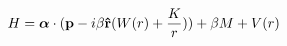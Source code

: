 \begin{equation}
H= {\mbox{\boldmath $\alpha$}}\cdot({\bf p}-i\beta{\bf {\hat r}}(W(r)+
{K\over r})) +\beta M+V(r)
\end{equation}

